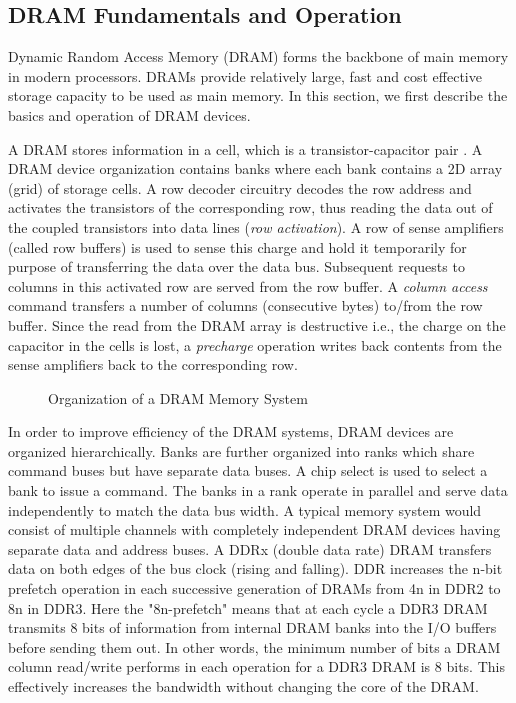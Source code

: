 \subsection{DRAM Fundamentals and Operation} \label{dram-background}
Dynamic Random Access Memory (DRAM) forms the backbone of main memory in modern processors. DRAMs provide relatively large, fast and cost effective storage capacity to be used as main memory. In this section, we first describe the basics and operation of DRAM  devices.

\par A DRAM stores information in a cell, which is a transistor-capacitor pair \cite{dram-book}. A DRAM device organization contains banks where each bank contains a 2D array (grid) of storage cells. A row decoder circuitry decodes the row address and activates the transistors of the corresponding row, thus reading the data out of the coupled transistors into data lines (\textit{row activation}). A row of sense amplifiers (called row buffers) is used to sense this charge and hold it temporarily for purpose of transferring the data over the data bus. Subsequent requests to columns in this activated row are served from the row buffer. A \textit{column access} command transfers a number of columns (consecutive bytes) to/from the row buffer. Since the read from the DRAM array is destructive i.e., the charge on the capacitor in the cells is lost, a \textit{precharge} operation writes back contents from the sense amplifiers back to the corresponding row.
\begin{figure}[!htb]
	\centering
	\def\svgwidth{\columnwidth}
	
	\caption{Organization of a DRAM Memory System}
	\label{fig:dram-basics}
\end{figure}
\par In order to improve efficiency of the DRAM systems, DRAM devices are organized hierarchically. Banks are further organized into ranks which share command buses but have separate data buses. A chip select is used to select a bank to issue a command.  The banks in a rank operate in parallel and serve data independently to match the data bus width. A typical memory system would consist of multiple channels with completely independent DRAM devices having separate data and address buses. A DDRx (double data rate) DRAM transfers data on both edges of the bus clock (rising and falling). DDR increases the n-bit prefetch operation in each successive generation of DRAMs from 4n in DDR2 to 8n in DDR3. Here the "8n-prefetch" means that at each cycle a DDR3 DRAM transmits 8 bits of information from internal DRAM banks into the I/O buffers before sending them out. In other words, the minimum number of bits a DRAM column read/write performs in each operation for a DDR3 DRAM is 8 bits. This effectively increases the bandwidth without changing the core of the DRAM.
